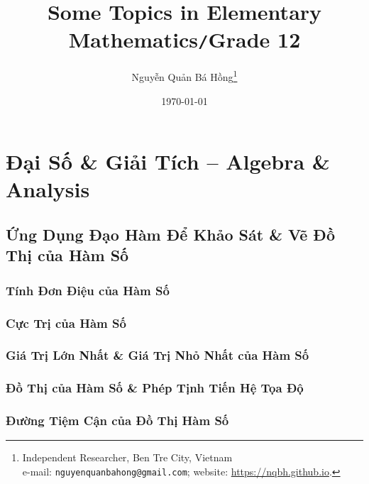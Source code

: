\documentclass[oneside]{book}
\title{Some Topics in Elementary Mathematics\texttt{/}Grade 12}
\author{Nguyễn Quản Bá Hồng\footnote{Independent Researcher, Ben Tre City, Vietnam\\e-mail: \texttt{nguyenquanbahong@gmail.com}; website: \url{https://nqbh.github.io}.}}
\date{\today}
\numberwithin{equation}{section}
\begin{document}
\frontmatter
\maketitle
\setcounter{secnumdepth}{4}
\setcounter{tocdepth}{3}
\tableofcontents
\newpage


\mainmatter

\part{Đại Số \& Giải Tích -- Algebra \& Analysis}

\chapter{Ứng Dụng Đạo Hàm Để Khảo Sát \& Vẽ Đồ Thị của Hàm Số}

\section{Tính Đơn Điệu của Hàm Số}


\section{Cực Trị của Hàm Số}


\section{Giá Trị Lớn Nhất \& Giá Trị Nhỏ Nhất của Hàm Số}


\section{Đồ Thị của Hàm Số \& Phép Tịnh Tiến Hệ Tọa Độ}


\section{Đường Tiệm Cận của Đồ Thị Hàm Số}
\end{document}
